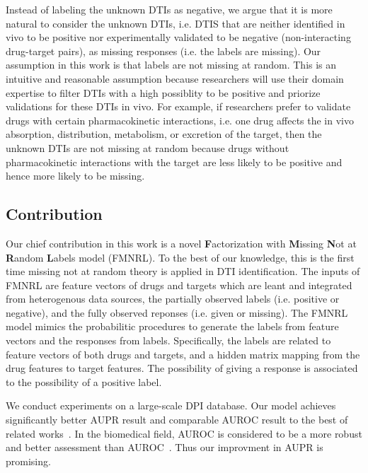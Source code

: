 \documentclass[sigconf,anonymous]{acmart}
\begin{document}
Instead of labeling the unknown DTIs as negative, we argue that it is more natural to consider the unknown DTIs, i.e. DTIS that are neither identified in vivo to be positive nor experimentally validated to be negative (non-interacting drug-target pairs), as missing responses (i.e. the labels are missing). Our assumption in this work is that labels are not missing at random. This is an intuitive and reasonable assumption because researchers will use their domain expertise to filter DTIs with a high possiblity to be positive and priorize validations for these DTIs in vivo. For example, if researchers prefer to validate drugs with certain pharmacokinetic interactions, i.e. one drug affects the in vivo absorption, distribution, metabolism, or excretion of the target, then the unknown DTIs are not missing at random because drugs without pharmacokinetic interactions with the target are less likely to be positive and hence more likely to be missing.

\subsection{Contribution}
Our chief contribution in this work is a novel \textbf{F}actorization with \textbf{M}issing \textbf{N}ot at \textbf{R}andom \textbf{L}abels model (FMNRL). To the best of our knowledge, this is the first time missing not at random theory is applied in DTI identification. The inputs of FMNRL are feature vectors of drugs and targets which are leant and integrated from heterogenous data sources, the partially observed labels (i.e. positive or negative), and the fully observed reponses (i.e. given or missing). The FMNRL model mimics the probabilitic procedures to generate the labels from feature vectors and the responses from labels. Specifically, the labels are related to feature vectors of both drugs and targets, and a hidden matrix mapping from the drug features to target features. The possibility of giving a response is associated to the possibility of a positive label.

We conduct experiments on a large-scale DPI database. Our model achieves significantly better AUPR result and comparable AUROC result to the best of related works~\cite{Luo2017Network}. In the biomedical field, AUROC is considered to be a more robust and better assessment than AUROC~\cite{Luo2017Network}. Thus our improvment in AUPR is promising.
\end{document}
